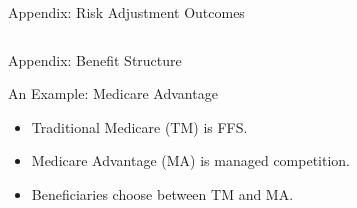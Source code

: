 \documentclass[professionalfonts, aspectratio=169]{beamer}
\begin{document}
\begin{frame}{Appendix: Risk Adjustment Outcomes}
\begin{columns}
  \end{columns}
\end{frame}

\begin{frame}{Appendix: Benefit Structure}
  \begin{figure}
    \begin{figure}
      \centering
      \resizebox{0.8\textwidth}{!}{}
    \end{figure}
  \end{figure}
\end{frame}

\begin{frame}{An Example: Medicare Advantage}
  \begin{figure}
    \centering
    \resizebox{0.6\textwidth}{!}{}
  \end{figure}
  \begin{itemize}\small
    \item Traditional Medicare (TM) is FFS.
    \item Medicare Advantage (MA) is managed competition.
    \item Beneficiaries choose between TM and MA.
  \end{itemize}
  \end{frame}
\end{document}
